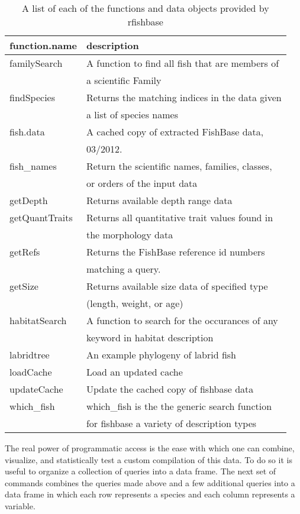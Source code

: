 \begin{table}[ht]
\begin{center}
\begin{tabular}{ll}
  \hline
function.name & description \\ 
  \hline
familySearch & A function to find all fish that are members of \\ 
   & a scientific Family \\ 
  findSpecies & Returns the matching indices in the data given \\ 
   & a list of species names \\ 
  fish.data & A cached copy of extracted FishBase data, \\ 
   & 03/2012. \\ 
  fish\_names & Return the scientific names, families, classes, \\ 
   & or orders of the input data \\ 
  getDepth & Returns available depth range data \\ 
  getQuantTraits & Returns all quantitative trait values found in \\ 
   & the morphology data \\ 
  getRefs & Returns the FishBase reference id numbers \\ 
   & matching a query. \\ 
  getSize & Returns available size data of specified type \\ 
   & (length, weight, or age) \\ 
  habitatSearch & A function to search for the occurances of any \\ 
   & keyword in habitat description \\ 
  labridtree & An example phylogeny of labrid fish \\ 
  loadCache & Load an updated cache \\ 
  updateCache & Update the cached copy of fishbase data \\ 
  which\_fish & which\_fish is the the generic search function \\ 
   & for fishbase a variety of description types \\ 
   \hline
\end{tabular}
\caption{A list of each of the functions and data objects provided by rfishbase}
\end{center}
\end{table}

The real power of programmatic access is the ease with which one can
combine, visualize, and statistically test a custom compilation of this
data. To do so it is useful to organize a collection of queries into a
data frame. The next set of commands combines the queries made above and
a few additional queries into a data frame in which each row represents
a species and each column represents a variable.

